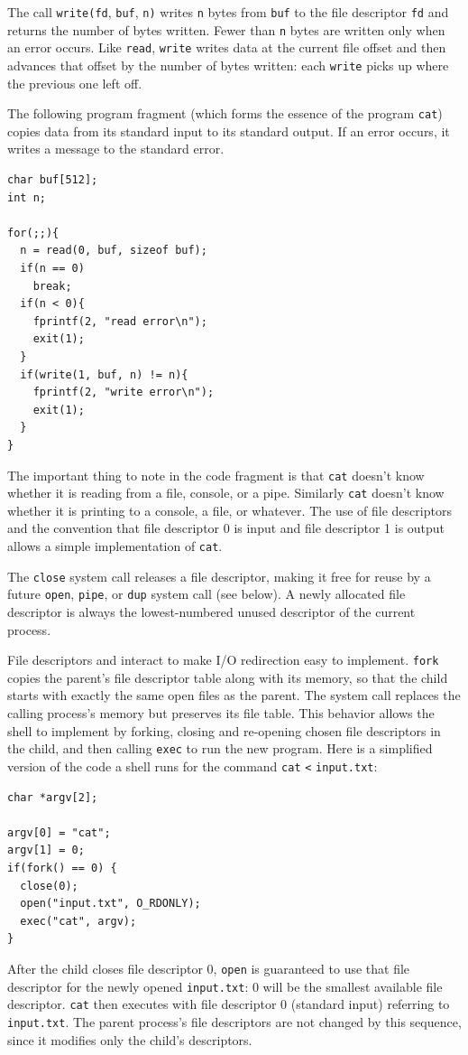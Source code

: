 The call
\lstinline{write(fd},
\lstinline{buf},
\lstinline{n)}
writes
\lstinline{n}
bytes from
\lstinline{buf}
to the file descriptor
\lstinline{fd}
and returns the number of bytes written.
Fewer than
\lstinline{n}
bytes are written only when an error occurs.
Like
\lstinline{read},
\lstinline{write}
writes data at the current file offset and then advances
that offset by the number of bytes written:
each
\lstinline{write}
picks up where the previous one left off.

The following program fragment (which forms the essence of the program
\lstinline{cat})
copies data from its standard input
to its standard output.  If an error occurs, it writes a message
to the standard error.
\begin{lstlisting}[]
char buf[512];
int n;

for(;;){
  n = read(0, buf, sizeof buf);
  if(n == 0)
    break;
  if(n < 0){
    fprintf(2, "read error\n");
    exit(1);
  }
  if(write(1, buf, n) != n){
    fprintf(2, "write error\n");
    exit(1);
  }
}
\end{lstlisting}
The important thing to note in the code fragment is that
\lstinline{cat}
doesn't know whether it is reading from a file, console, or a pipe.
Similarly 
\lstinline{cat}
doesn't know whether it is printing to a console, a file, or whatever.
The use of file descriptors and the convention that file descriptor 0
is input and file descriptor 1 is output allows a simple
implementation
of 
\lstinline{cat}.

The
\lstinline{close}
system call
releases a file descriptor, making it free for reuse by a future
\lstinline{open},
\lstinline{pipe},
or
\lstinline{dup}
system call (see below).
A newly allocated file descriptor 
is always the lowest-numbered unused
descriptor of the current process.

File descriptors and
interact to make I/O redirection easy to implement.
\lstinline{fork}
copies the parent's file descriptor table along with its memory,
so that the child starts with exactly the same open files as the parent.
The system call
replaces the calling process's memory but preserves its file table.
This behavior allows the shell to
implement  by forking,
closing and re-opening chosen file descriptors in the child,
and then calling \lstinline{exec} to run the new program.
Here is a simplified version of the code a shell runs for the
command
\lstinline{cat}
\lstinline{<}
\lstinline{input.txt}:
\begin{lstlisting}[]
char *argv[2];

argv[0] = "cat";
argv[1] = 0;
if(fork() == 0) {
  close(0);
  open("input.txt", O_RDONLY);
  exec("cat", argv);
}
\end{lstlisting}
After the child closes file descriptor 0,
\lstinline{open}
is guaranteed to use that file descriptor
for the newly opened
\lstinline{input.txt}:
0 will be the smallest available file descriptor.
\lstinline{cat}
then executes with file descriptor 0 (standard input) referring to
\lstinline{input.txt}.
The parent process's file descriptors are not changed by this
sequence, since it modifies only the child's descriptors.

